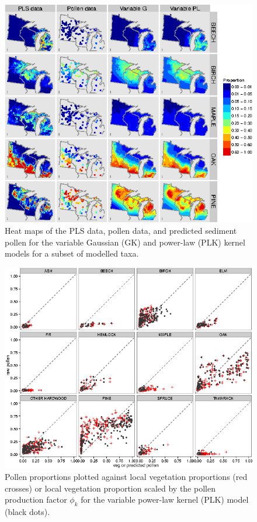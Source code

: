 \begin{figure}
\centering
\includegraphics[width=7in]{figures/map_pls_pollen.png}
\caption[PLS data, pollen data, predicted pollen heat
  maps]{\internallinenumbers \doublespacing Heat maps of the PLS data, pollen data, and
  predicted sediment pollen for the variable Gaussian (GK) and
  power-law (PLK) kernel models for a subset of modelled taxa.}
\label{fig:maps_pp}
\end{figure}

\begin{figure}
\centering
\includegraphics[width=7in]{figures/pollen_phi_scaled_pl_Ka_Kgamma.png}
\caption[Pollen-vegetation scatter, $\phi$-scaled]{\internallinenumbers \doublespacing
  Pollen proportions plotted against local vegetation proportions (red
  crosses) or local vegetation proportion scaled by the pollen
  production factor $\phi_k$ for the variable power-law kernel (PLK)
  model (black dots).}
\label{fig:focal_scaled}
\end{figure}

